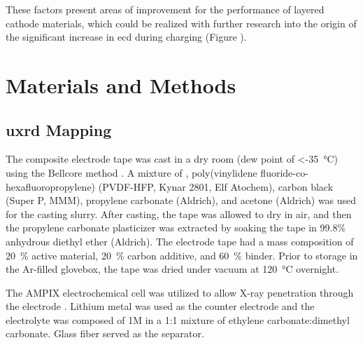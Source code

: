 \documentclass{article}
\begin{document}
  These factors present areas of
improvement for the performance of layered cathode materials, which
could be realized with further research into the origin of the
significant increase in \gls{ecd} during charging (Figure
).

\section*{Materials and Methods}
\label{sec:methods}

\subsection*{\gls{uxrd} Mapping}

The \nca{} composite electrode tape was cast in a dry room (dew point
of \SI{<-35}{\celsius}) using the Bellcore method \cite{warren1996}. A
mixture of \nca{}, poly(vinylidene fluoride-co-hexafluoropropylene)
(PVDF-HFP, Kynar 2801, Elf Atochem), carbon black (Super P, MMM),
propylene carbonate (Aldrich), and acetone (Aldrich) was used for the
casting slurry. After casting, the tape was allowed to dry in air, and
then the propylene carbonate plasticizer was extracted by soaking the
tape in 99.8\% anhydrous diethyl ether (Aldrich). The electrode tape
had a mass composition of \SI{20}{\percent} active material,
\SI{20}{\percent} carbon additive, and \SI{60}{\percent} binder. Prior
to storage in the Ar-filled glovebox, the tape was dried under vacuum
at \SI{120}{\celsius} overnight.

The AMPIX electrochemical cell was utilized to allow X-ray penetration
through the electrode \cite{borkiewicz2012}. Lithium metal was used as
the counter electrode and the electrolyte was composed of 1M
 in a 1:1 mixture of ethylene carbonate:dimethyl
carbonate. Glass fiber served as the separator.
\end{document}
